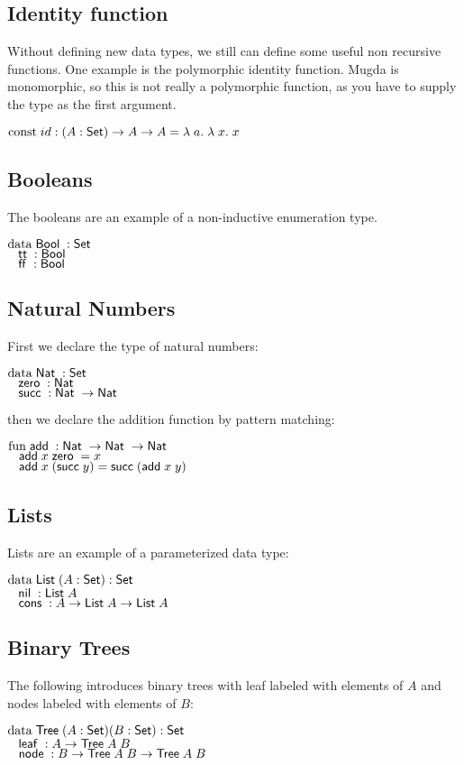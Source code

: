 \subsection{Identity function}
Without defining new data types, we still can define some useful non recursive functions.
One example is the polymorphic identity function. 
Mugda is monomorphic, so this is not really a polymorphic function, as you have to supply the
type as the first argument.
\begin{bsp}
$\mathrm{const}\; id : ( A : \mathsf{Set} ) \rightarrow{A \rightarrow A} = \lambda\; a .\;\lambda\; x .\;x$   
\end{bsp}

\subsection{Booleans}
The booleans are an example of a non-inductive enumeration type.
\begin{bsp}
$\mathrm{data}\; \mathsf{Bool}\; : \mathsf{Set}$  \\
$\hspace*{3mm} \mathsf{tt}\; : \mathsf{Bool}\; $\\
$\hspace*{3mm} \mathsf{ff}\; : \mathsf{Bool}\; $
\end{bsp}

\subsection{Natural Numbers}
First we declare the type of natural numbers:
\begin{bsp}
$\mathrm{data}\; \mathsf{Nat}\; : \mathsf{Set}$ \\
$\hspace*{3mm} \mathsf{zero}\; : \mathsf{Nat}\; $\\
$\hspace*{3mm} \mathsf{succ}\; : \mathsf{Nat}\; \rightarrow \mathsf{Nat}\;$
\end{bsp}
then we declare the addition function by pattern matching:
\begin{bsp}
$\mathrm{fun}\; \mathsf{add}\; : \mathsf{Nat}\; \rightarrow \mathsf{Nat}\; \rightarrow \mathsf{Nat}\;$\\
$\hspace*{3mm} \mathsf{add}\; x \; \mathsf{zero}\; = x $\\
$\hspace*{3mm} \mathsf{add}\; x \; (\mathsf{succ}\; y) = \mathsf{succ}\; (\mathsf{add}\; x \; y)  $
\end{bsp}
\subsection{Lists}
Lists are an example of a parameterized data type:
\begin{bsp}
$\mathrm{data}\; \mathsf{List}\; ( A : \mathsf{Set} ) : \mathsf{Set} $ \\
$ \hspace*{3mm} \mathsf{nil}\; : \mathsf{List}\; A  $\\
$ \hspace*{3mm} \mathsf{cons}\; : A \rightarrow \mathsf{List}\; A \rightarrow \mathsf{List}\; A $
\end{bsp}
\subsection{Binary Trees}
The following introduces binary trees with leaf labeled with elements of $A$ and nodes labeled with elements of $B$:
\begin{bsp}
$\mathrm{data}\; \mathsf{Tree}\; ( A : \mathsf{Set} ) ( B : \mathsf{Set} ) : \mathsf{Set} $ \\
$ \hspace*{3mm} \mathsf{leaf}\; : A \rightarrow \mathsf{Tree}\; A \; B $\\
$ \hspace*{3mm} \mathsf{node}\; : B \rightarrow \mathsf{Tree}\; A \; B \rightarrow \mathsf{Tree}\; A \; B $
\end{bsp}

